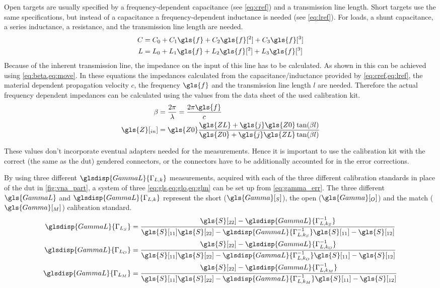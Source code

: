 \documentclass[12pt,a4paper,parskip=full,abstract=true,BCOR=12mm]{scrreprt}
\begin{document}
Open targets are usually specified by a frequency-dependent capacitance (see
\cref{eq:cref}) and a transmission line length. Short targets use the same
specifications, but instead of a capacitance a frequency-dependent inductance is
needed (see \cref{eq:lref}). For loads, a shunt capacitance, a series inductance,
a resistance, and the transmission line length are needed.
\begin{align}
    \label{eq:cref} C & = C_0 + C_1 \gls{f} + C_2 \gls{f}[^2] + C_3 \gls{f}[^3] \\
    \label{eq:lref} L & = L_0 + L_1 \gls{f} + L_2 \gls{f}[^2] + L_3 \gls{f}[^3]
\end{align}
Because of the inherent transmission line, the impedance on the input of this
line has to be calculated. As shown in \cite{pozar_mw_engineering_2011} this
can be achieved using \cref{eq:beta,eq:move}. In these equations the impedances
calculated from the capacitance/inductance provided by \cref{eq:cref,eq:lref},
the material dependent propagation velocity $c$, the frequency $\gls{f}$ and the transmission line
length $l$ are needed. Therefore the actual frequency dependent impedances can
be calculated using the values from the data sheet of the used calibration kit.
\begin{align}
    \label{eq:beta} \beta & = \frac{2 \pi}{\lambda} = \frac{2 \pi \gls{f}}{c}\\
    \label{eq:move} \gls{Z}[_{in}] & = \gls{Z0} \frac{\gls{ZL} + \gls{j} \gls{Z0} \tan(\beta l)}{\gls{Z0} + \gls{j} \gls{ZL} \tan(\beta l)}
\end{align}

These values don't incorporate eventual adapters needed for the measurements.
Hence it is important to use the calibration kit with the correct (the same as the \gls{dut}) gendered connectors, or
the connectors have to be additionally accounted for in the error corrections.

By using three different $\glsdisp{GammaL}{\Gamma_{L,k}}$ measurements, acquired with each of the three different calibration standards in place of the \gls{dut} in \cref{fig:vna_part},
a system of three \cref{eq:gls,eq:glo,eq:glm} can be set up from \cref{eq:gamma_err}. The
three different $\gls{GammaL}$ and $\glsdisp{GammaL}{\Gamma_{L,k}}$ represent the short ($\gls{Gamma}[_S]$),
the open ($\gls{Gamma}[_O]$) and the match ($\gls{Gamma}[_M]$) calibration standard.
\begin{align}
    \label{eq:gls} \glsdisp{GammaL}{\Gamma_{L_S}} & = \frac{\gls{S}[_{22}] - \glsdisp{GammaL}{\Gamma_{L,k_S}^{-1}}}{\gls{S}[_{11}] \gls{S}[_{22}] - \glsdisp{GammaL}{\Gamma_{L,k_S}^{-1}}\gls{S}[_{11}] - \gls{S}[_{12}]} \\
    \label{eq:glo} \glsdisp{GammaL}{\Gamma_{L_O}} & = \frac{\gls{S}[_{22}] - \glsdisp{GammaL}{\Gamma_{L,k_O}^{-1}}}{\gls{S}[_{11}] \gls{S}[_{22}] - \glsdisp{GammaL}{\Gamma_{L,k_O}^{-1}}\gls{S}[_{11}] - \gls{S}[_{12}]} \\
    \label{eq:glm} \glsdisp{GammaL}{\Gamma_{L_M}} & = \frac{\gls{S}[_{22}] - \glsdisp{GammaL}{\Gamma_{L,k_M}^{-1}}}{\gls{S}[_{11}] \gls{S}[_{22}] - \glsdisp{GammaL}{\Gamma_{L,k_M}^{-1}}\gls{S}[_{11}] - \gls{S}[_{12}]}
\end{align}
\end{document}
